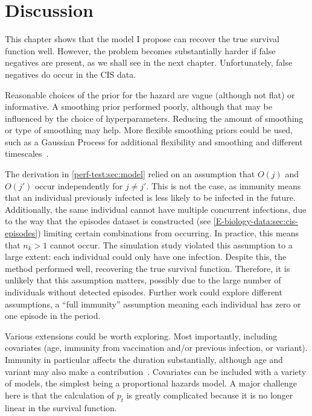 \documentclass[thesis.tex]{subfiles}
\begin{document}
\section{Discussion} \label{perf-test:sec:discussion}

This chapter shows that the model I propose can recover the true survival function well.
However, the problem becomes substantially harder if false negatives are present, as we shall see in the next chapter.
Unfortunately, false negatives do occur in the CIS data.

Reasonable choices of the prior for the hazard are vague (although not flat) or informative.
A smoothing prior performed poorly, although that may be influenced by the choice of hyperparameters.
Reducing the amount of smoothing or type of smoothing may help.
More flexible smoothing priors could be used, such as a Gaussian Process for additional flexibility and smoothing and different timescales~\autocite{saulGaussian}.

The derivation in \cref{perf-test:sec:model} relied on an assumption that $O(j)$ and $O(j')$ occur independently for $j \neq j'$.
This is not the case, as immunity means that an individual previously infected is less likely to be infected in the future.
Additionally, the same individual cannot have multiple concurrent infections, due to the way that the episodes dataset is constructed (see \cref{E-biology-data:sec:cis-episodes}) limiting certain combinations from occurring.
In practice, this means that $n_k > 1$ cannot occur.
The simulation study violated this assumption to a large extent: each individual could only have one infection.
Despite this, the method performed well, recovering the true survival function.
Therefore, it is unlikely that this assumption matters, possibly due to the large number of individuals without detected episodes.
Further work could explore different assumptions, \eg a ``full immunity'' assumption meaning each individual has zero or one episode in the period.

Various extensions could be worth exploring.
Most importantly, including covariates (\eg age, immunity from vaccination and/or previous infection, or variant).
Immunity in particular affects the duration substantially, although age and variant may also make a contribution~\autocite{hakkiOnset,russellWithinhost}.
Covariates can be included with a variety of models, the simplest being a proportional hazards model.
A major challenge here is that the calculation of $p_t$ is greatly complicated because it is no longer linear in the survival function.
\end{document}
